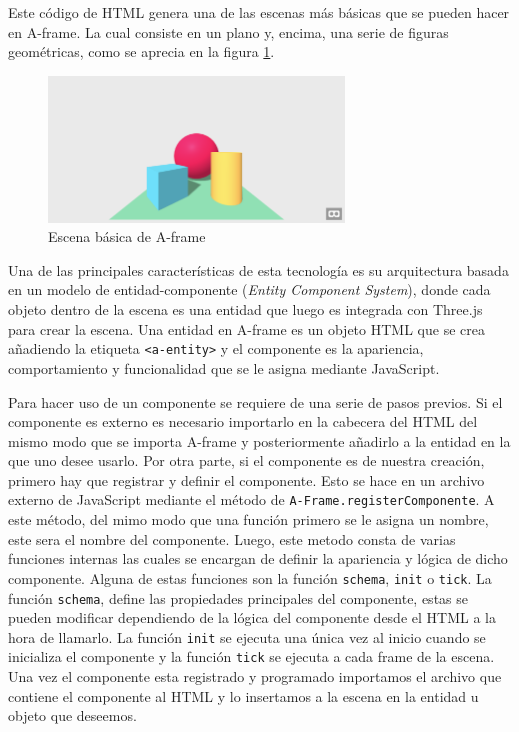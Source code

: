 \documentclass[a4paper, 12pt]{book}
\begin{document}
Este código de HTML genera una de las escenas más básicas que se pueden hacer en A-frame. La cual consiste en un plano y, encima, una serie de figuras geométricas, como se aprecia en la figura \ref{fig:aframe-basic}.

\begin{figure}[H]  
  \centering
  \includegraphics[width=0.7\textwidth]{img/aframe_hello_world.png}
  \caption{Escena básica de A-frame}
  \label{fig:aframe-basic}
\end{figure}

Una de las principales características de esta tecnología es su arquitectura basada en un modelo de entidad-componente (\textit{Entity Component System}), donde cada objeto dentro de la escena es una entidad que luego es integrada con Three.js para crear la escena.
Una entidad en A-frame es un objeto HTML que se crea añadiendo la etiqueta \texttt{<a-entity>} y el componente es la apariencia, comportamiento y funcionalidad que se le asigna mediante JavaScript. 

Para hacer uso de un componente se requiere de una serie de pasos previos. Si el componente es externo es necesario importarlo en la cabecera del HTML del mismo modo que se importa A-frame y posteriormente añadirlo a la entidad en la que uno desee usarlo.
Por otra parte, si el  componente es de nuestra creación, primero hay que registrar y definir el componente. Esto se hace en un archivo externo de JavaScript mediante el método de \texttt{A-Frame.registerComponente}. A este método, del mimo modo que una función primero se le asigna un nombre, 
este sera el nombre del componente. Luego, este metodo consta de varias funciones internas las cuales se encargan de definir la apariencia y lógica de dicho componente. Alguna de estas funciones son la función \texttt{schema}, \texttt{init} o \texttt{tick}.
La función \texttt{schema}, define las propiedades principales del componente, estas se pueden modificar dependiendo de la lógica del componente desde el HTML a la hora de llamarlo. La función \texttt{init} se ejecuta una única vez al inicio cuando se inicializa el componente y la función \texttt{tick} se ejecuta a cada frame de la escena.
Una vez el componente esta registrado y programado importamos el archivo que contiene el componente al HTML y lo insertamos a la escena en la entidad u objeto que deseemos. 
\end{document}
